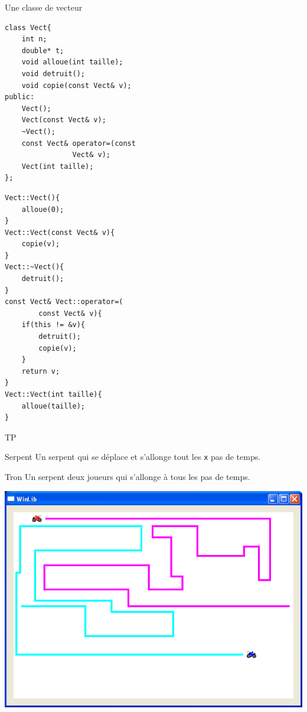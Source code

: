 \begin{frame}[fragile=singleslide]{Une classe de vecteur}

    \begin{minipage}{0.44\linewidth}
        
            \begin{verbatim}
class Vect{
    int n;
    double* t;
    void alloue(int taille);
    void detruit();
    void copie(const Vect& v);
public:
    Vect();
    Vect(const Vect& v);
    ~Vect();
    const Vect& operator=(const
                Vect& v);
    Vect(int taille);
};
            \end{verbatim}
        
    \end{minipage}
    \hfill
    \begin{minipage}{0.50\linewidth}
        
            \begin{verbatim}
Vect::Vect(){
    alloue(0);
}
Vect::Vect(const Vect& v){
    copie(v);
}
Vect::~Vect(){
    detruit();
}
const Vect& Vect::operator=(
        const Vect& v){
    if(this != &v){
        detruit();
        copie(v);
    }
    return v;
}
Vect::Vect(int taille){
    alloue(taille);
}
            \end{verbatim}
        
    \end{minipage}
\end{frame}

\begin{frame}{TP}
    \begin{minipage}{0.47\linewidth}
        \begin{block}{Serpent}
            Un serpent qui se déplace et s'allonge tout les \texttt{x} pas de temps.
        \end{block}
            \begin{block}{Tron}
                Un serpent deux joueurs qui s'allonge à tous les pas de temps.
            \end{block}

    \end{minipage}
    \hfill
    \begin{minipage}{0.47\linewidth}
        \includegraphics[width=\linewidth]{images/tp.png}
    \end{minipage}
\end{frame}


